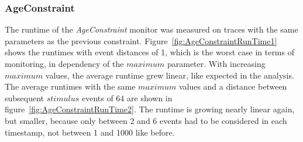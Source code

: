 \subsubsection{AgeConstraint}
The runtime of the \textit{AgeConstraint} monitor was measured on traces with the same parameters as the previous constraint. Figure~\ref{fig:AgeConstraintRunTime1} shows the runtimes with event distances of 1, which is the worst case in terms of monitoring, in dependency of the $maximum$ parameter. With increasing $maximum$ values, the average runtime grew linear, like expected in the analysis. The average runtimes with the same $maximum$ values and a distance between subsequent $stimulus$ events of 64 are shown in figure~\ref{fig:AgeConstraintRunTime2}. The runtime is growing nearly linear again, but smaller, because only between 2 and 6 events had to be considered in each timestamp, not between 1 and 1000 like before.
